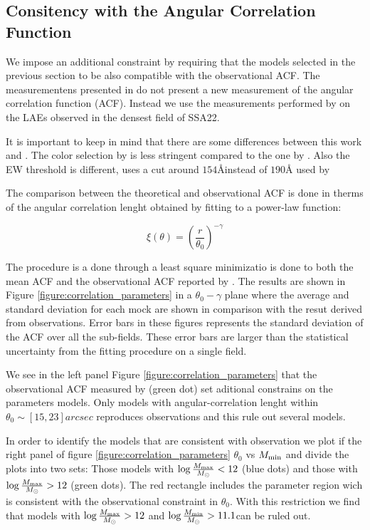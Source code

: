 \documentclass[usenatbib]{mn2e}
\begin{document}
\subsection{Consitency with the Angular Correlation Function}


We impose an additional constraint by requiring that the models
selected in the previous section to be also compatible with the
observational ACF. The measurementens presented in \citep{Yamada2012}
do not present a new measurement of the angular correlation function
(ACF). Instead we use the measurements performed by
\citep{Hayashino2004} on the LAEs observed in the densest field of
SSA22.   
 
It is important to keep in mind that there are some differences
between this work and \citep{Yamada2012}. The color selection by
\cite{Yamada2012} is less stringent compared to the one by
\cite{Hayashino2004}. Also the EW threshold is different,
\cite{Hayashino2004} uses a cut around $154$\AA instead of $190$\AA
used by \citep{Yamada2012}

The comparison between the theoretical and observational ACF is done in
therms of the angular correlation lenght obtained  by fitting to a power-law
function:  

\begin{equation}
\xi(\theta) = \left(\frac{r}{\theta_{0}}\right)^{-\gamma}
\end{equation}

The procedure is a done through a least square minimizatio is done to
both the mean ACF and the observational ACF reported by
\cite{Hayashino2004} .  The results are shown  in Figure
\ref{figure:correlation_parameters}  in a $\theta_{0}-\gamma$  plane
where the average and standard deviation for each mock  are shown in
comparison with the resut derived from observations.  Error bars in
these figures represents the standard deviation of the ACF over all
the sub-fields. These error bars are larger than the statistical
uncertainty from the fitting procedure on a single field.

We see in the left panel Figure \ref{figure:correlation_parameters} that
the observational ACF measured by \cite{Hayashino2004} (green dot) set aditional 
constrains on the parameters models. Only models with angular-correlation lenght within  
$\theta_{0}\sim[15,23]arcsec$ reproduces observations and this rule out several models. 

In order to identify the models that are consistent with observation we
plot if the right panel of figure \ref{figure:correlation_parameters} 
$\theta_{0}$ vs $M_{\rm min}$ and divide the plots into two sets: Those models
with $\log \frac{M_{\rm max}}{M_{\odot}}<12$ (blue dots) and those with 
$\log \frac{M_{\rm max}}{M_{\odot}}>12$ (green dots). The red rectangle includes
the parameter region wich is consistent with the observational constraint in $\theta_{0}$.
With this restriction we find that models with $\log \frac{M_{\rm max}}{M_{\odot}}>12$ and
$\log \frac{M_{\rm min}}{M_{\odot}}>11.1$can be ruled out.
\end{document}
